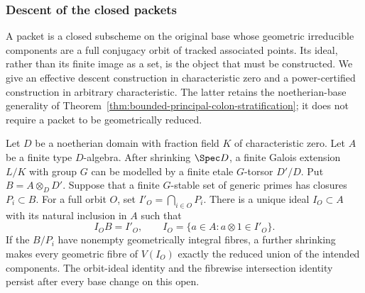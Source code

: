 \subsubsection{Descent of the closed packets}

A packet is a closed subscheme on the original base whose geometric
irreducible components are a full conjugacy orbit of tracked associated
points.  Its ideal, rather than its finite image as a set, is the object
that must be constructed.  We give an effective descent construction in
characteristic zero and a power-certified construction in arbitrary
characteristic.  The latter retains the noetherian-base generality of
Theorem~\ref{thm:bounded-principal-colon-stratification}; it does not
require a packet to be geometrically reduced.

\begin{lemma}
\label{lem:galois-packet-descent}
Let \(D\) be a noetherian domain with fraction field \(K\) of
characteristic zero.  Let \(A\) be a finite type \(D\)-algebra.
After shrinking \(\Spec D\), a finite Galois extension \(L/K\)
with group \(G\) can be modelled by a finite etale \(G\)-torsor
\(D'/D\).  Put \(B=A\otimes_DD'\).  Suppose that a finite
\(G\)-stable set of generic primes has closures \(P_i\subset B\).
For a full orbit \(O\), set \(I'_O=\bigcap_{i\in O}P_i\).
There is a unique ideal \(I_O\subset A\) with its natural inclusion
in \(A\) such that
\begin{equation}\label{eq:orbit-ideal-descent}
 I_O B=I'_O,\qquad
 I_O=\{a\in A:a\otimes1\in I'_O\}.
\end{equation}
If the \(B/P_i\) have nonempty geometrically integral fibres, a
further shrinking makes every geometric fibre of \(V(I_O)\)
exactly the reduced union of the intended components.  The orbit-ideal
identity and the fibrewise intersection identity persist after every
base change on this open.
\end{lemma}
